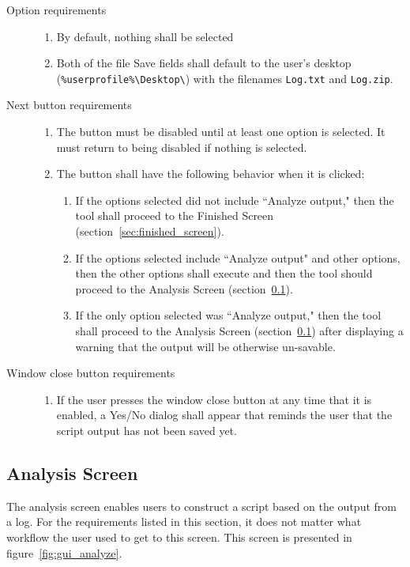 \begin{description}
\item[Option requirements] \hfill
\begin{enumerate}
  \item By default, nothing shall be selected
  \item Both of the file Save fields shall default to the user's desktop
  (\verb|%userprofile%\Desktop\|) with the filenames \verb|Log.txt| and
  \verb|Log.zip|.
\end{enumerate}
\item[Next button requirements] \hfill
\begin{enumerate}
  \item The button must be disabled until at least one option is selected. It
  must return to being disabled if nothing is selected.
  \item The button shall have the following behavior when it is clicked:
  \begin{enumerate}
    \item If the options selected did not include ``Analyze output," then the
    tool shall proceed to the Finished Screen
    (section~\ref{sec:finished_screen}).
    \item If the options selected include ``Analyze output" and other options,
    then the other options shall execute and then the tool should proceed to
    the Analysis Screen (section~\ref{sec:analysis_screen}).
    \item If the only option selected was ``Analyze output," then the tool
    shall proceed to the Analysis Screen (section~\ref{sec:analysis_screen})
    after displaying a warning that the output will be otherwise un-savable.
  \end{enumerate}
\end{enumerate}
\item[Window close button requirements] \hfill
\begin{enumerate}
  \item If the user presses the window close button at any time that it is
  enabled, a Yes/No dialog shall appear that reminds the user that the script
  output has not been saved yet.
\end{enumerate}
\end{description}


\subsection{Analysis Screen} \label{sec:analysis_screen}
The analysis screen enables users to construct a script based on the output
from a log.  For the requirements listed in this section, it does not
matter what workflow the user used to get to this screen.  This screen is
presented in figure~\ref{fig:gui_analyze}.

